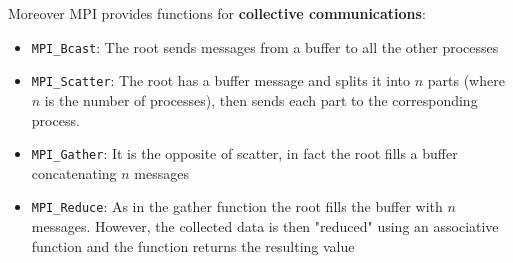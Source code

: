 Moreover MPI provides functions for \textbf{collective communications}:
\begin{itemize}
 \item \texttt{MPI\_Bcast}: The root sends messages from a buffer to all the other processes
 \item \texttt{MPI\_Scatter}: The root has a buffer message and splits it into $n$ parts (where $n$ is the number of processes), then sends each part to the corresponding process.
 \item \texttt{MPI\_Gather}: It is the opposite of scatter, in fact the root fills a buffer concatenating $n$ messages
 \item \texttt{MPI\_Reduce}: As in the gather function the root fills the buffer with $n$ messages. However, the collected data is then "reduced" using an associative function and the function returns the resulting value
\end{itemize}


